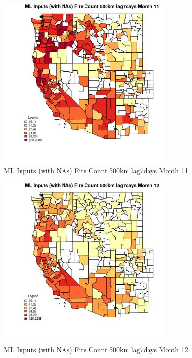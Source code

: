 \begin{figure} 
\centering  
\includegraphics[width=0.77\textwidth]{Code_Outputs/Report_ML_input_PM25_Step4_part_e_de_duplicated_aves_compiled_2019-05-20wNAs_CountyFire_Count_500km_lag7daysmedianMonth11.jpg} 
\caption{\label{fig:Report_ML_input_PM25_Step4_part_e_de_duplicated_aves_compiled_2019-05-20wNAsCountyFire_Count_500km_lag7daysmedianMonth11}ML Inputs (with NAs) Fire Count 500km lag7days Month 11} 
\end{figure} 
 

\begin{figure} 
\centering  
\includegraphics[width=0.77\textwidth]{Code_Outputs/Report_ML_input_PM25_Step4_part_e_de_duplicated_aves_compiled_2019-05-20wNAs_CountyFire_Count_500km_lag7daysmedianMonth12.jpg} 
\caption{\label{fig:Report_ML_input_PM25_Step4_part_e_de_duplicated_aves_compiled_2019-05-20wNAsCountyFire_Count_500km_lag7daysmedianMonth12}ML Inputs (with NAs) Fire Count 500km lag7days Month 12} 
\end{figure} 
 

